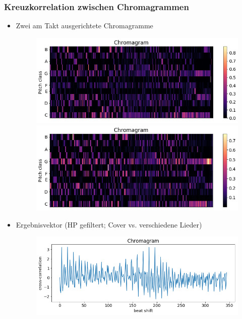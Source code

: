 \documentclass[12pt]{FSUBeamer_official}
\begin{document}
\begin{frame}
	\frametitle{Kreuzkorrelation zwischen Chromagrammen}
	\begin{itemize}
		\item Zwei am Takt ausgerichtete Chromagramme
		\begin{figure}[ht]
			\begin{minipage}[b]{0.45\linewidth}
				\centering
				\includegraphics[width=\textwidth]{pics/Chroma/rach1chrom.png}
			\end{minipage}
			\hspace{0.5cm}
			\begin{minipage}[b]{0.45\linewidth}
				\centering
				\includegraphics[width=\textwidth]{pics/Chroma/rach2chrom.png}
			\end{minipage}
		\end{figure}
		\item Ergebnisvektor (HP gefiltert;  Cover vs. verschiedene Lieder)
		\begin{figure}[ht]
			\begin{minipage}[b]{0.45\linewidth}
				\centering
				\includegraphics[width=\textwidth]{pics/Chroma/beatalignedchroma_corr_mean_filt.png}

\end{minipage}
\end{figure}
\end{itemize}
\end{frame}
\end{document}

